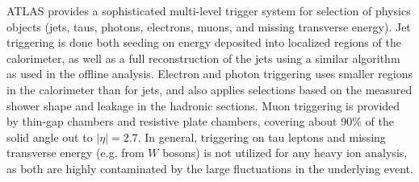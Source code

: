 ATLAS provides a sophisticated multi-level trigger system for 
selection of physics objects (jets, taus, photons, electrons, muons,
and missing transverse energy).
Jet triggering is done both seeding on energy deposited into localized
regions of the calorimeter, as well as a full reconstruction of the jets
using a similar algorithm as used in the offline analysis.
Electron and photon triggering uses smaller regions in the calorimeter
than for jets, and also applies selections based on the measured shower
shape and leakage in the hadronic sections.
Muon triggering is provided by thin-gap chambers and resistive plate chambers,
covering about 90\% of the solid angle out to $|\eta|=2.7$.
In general, triggering on tau leptons and missing transverse energy (e.g.
from $W$ bosons) is not utilized for any heavy ion analysis, as both
are highly contaminated by the large fluctuations in the 
underlying event.
